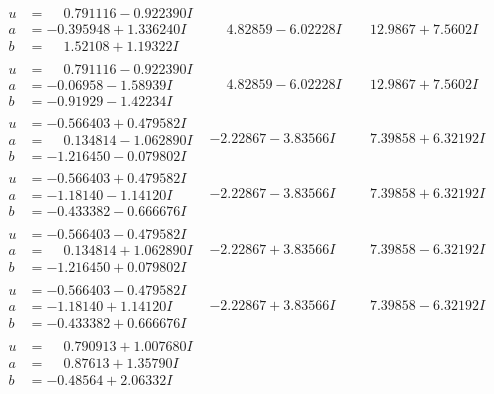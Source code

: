 \documentclass[1p]{elsarticle_modified}
\theoremstyle{definition}
\begin{document}
$$\begin{array}{c|c|c}
\begin{aligned}
u &= \phantom{-}0.791116 - 0.922390 I \\
a &= -0.395948 + 1.336240 I \\
b &= \phantom{-}1.52108 + 1.19322 I\end{aligned}
 & \phantom{-}4.82859 - 6.02228 I & \phantom{-}12.9867 + 7.5602 I \\ \hline\begin{aligned}
u &= \phantom{-}0.791116 - 0.922390 I \\
a &= -0.06958 - 1.58939 I \\
b &= -0.91929 - 1.42234 I\end{aligned}
 & \phantom{-}4.82859 - 6.02228 I & \phantom{-}12.9867 + 7.5602 I \\ \hline\begin{aligned}
u &= -0.566403 + 0.479582 I \\
a &= \phantom{-}0.134814 - 1.062890 I \\
b &= -1.216450 - 0.079802 I\end{aligned}
 & -2.22867 - 3.83566 I & \phantom{-}7.39858 + 6.32192 I \\ \hline\begin{aligned}
u &= -0.566403 + 0.479582 I \\
a &= -1.18140 - 1.14120 I \\
b &= -0.433382 - 0.666676 I\end{aligned}
 & -2.22867 - 3.83566 I & \phantom{-}7.39858 + 6.32192 I \\ \hline\begin{aligned}
u &= -0.566403 - 0.479582 I \\
a &= \phantom{-}0.134814 + 1.062890 I \\
b &= -1.216450 + 0.079802 I\end{aligned}
 & -2.22867 + 3.83566 I & \phantom{-}7.39858 - 6.32192 I \\ \hline\begin{aligned}
u &= -0.566403 - 0.479582 I \\
a &= -1.18140 + 1.14120 I \\
b &= -0.433382 + 0.666676 I\end{aligned}
 & -2.22867 + 3.83566 I & \phantom{-}7.39858 - 6.32192 I \\ \hline\begin{aligned}
u &= \phantom{-}0.790913 + 1.007680 I \\
a &= \phantom{-}0.87613 + 1.35790 I \\
b &= -0.48564 + 2.06332 I\end{aligned}

\end{array}$$
\end{document}
